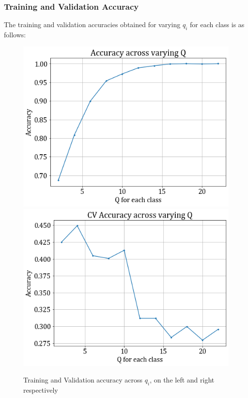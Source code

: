 \documentclass[11pt,a4paper]{article}
\begin{document}
\subsubsection{Training and Validation Accuracy}
The training and validation accuracies obtained for varying $q_i$ for each class is as follows:
\begin{figure}[H]
    \hspace{-2em}
    \includegraphics[scale=0.5]{images/2A/2A_full_train_acc.png}
    \includegraphics[scale=0.5]{images/2A/2A_full_val_acc.png}
    \caption{Training and Validation accuracy across $q_i$, on the left and right respectively}
\end{figure}
\end{document}
